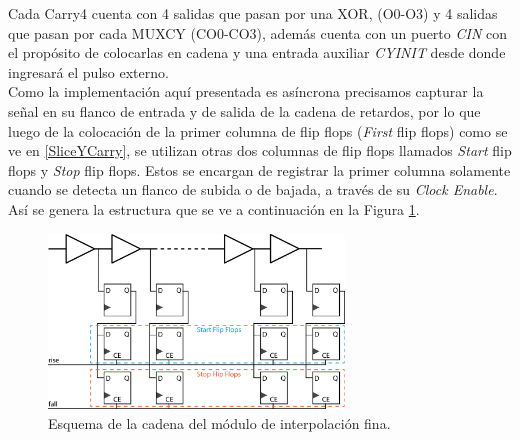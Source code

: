 Cada Carry4 cuenta con 4 salidas que pasan por una XOR, (O0-O3) y 4 salidas que pasan por
cada MUXCY (CO0-CO3), además cuenta con un puerto \textit{CIN} con el propósito de colocarlas
en cadena y una entrada auxiliar \textit{CYINIT} desde donde ingresará el pulso externo.\\
Como la implementación aquí presentada es asíncrona precisamos capturar la señal en su flanco de entrada y de
salida de la cadena de retardos, por lo que luego de la colocación de la primer columna de flip flops (\textit{First} flip flops) 
como se ve en \ref{SliceYCarry}, se utilizan otras dos columnas de flip flops llamados \textit{Start} flip flops y \textit{Stop} 
flip flops. Estos se encargan de registrar la primer columna solamente cuando se detecta un flanco de subida o de bajada,
a través de su \textit{Clock Enable}. Así se genera la estructura que se ve a continuación en la Figura \ref{fig: fine}.

\begin{figure}[H]
     \centering
     \includegraphics[width=0.7\textwidth]{imagenes/fine.eps}
     \caption{Esquema de la cadena del módulo de interpolación fina.}
     \label{fig: fine}
\end{figure}

